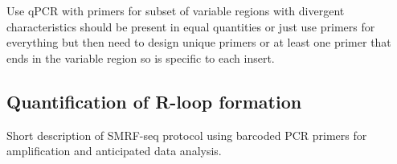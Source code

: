 \documentclass[11pt]{article}
\begin{document}
Use qPCR with primers for subset of variable regions with divergent characteristics should be present in equal quantities or just use primers for everything but then need to design unique primers or at least one primer that ends in the variable region so is specific to each insert. 

\subsection{Quantification of R-loop formation }

Short description of SMRF-seq protocol using barcoded PCR primers for amplification 
and anticipated data analysis. 


\pagebreak


\end{document}
